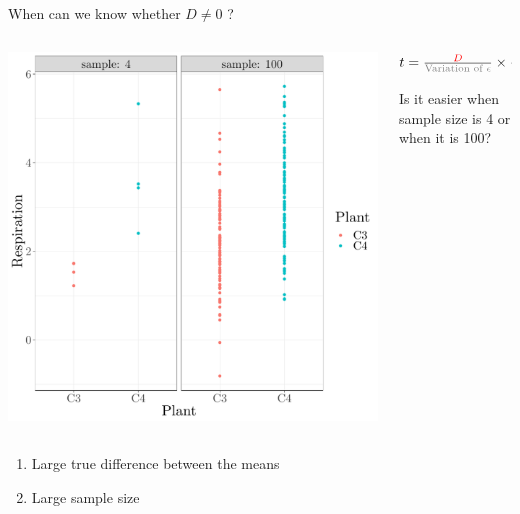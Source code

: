 \documentclass[10pt]{beamer}
\begin{document}
\begin{frame}{When can we know whether $D \neq 0$ ?}

 \begin{columns}
 \begin{column}{0.5\textwidth}
 \includegraphics[width=\textwidth]{Figures/figure/ttestsample-1}
 \end{column}
 \begin{column}{0.5\textwidth}
  $ t = \frac{\color{red}{D}}{\text{\color{gray}{Variation of }}\color{gray}{\epsilon}} \times \frac{\text{Sample Size}}{\sqrt{2}}$

  \vspace{1cm}
  Is it easier when sample size is 4 or when it is 100?
 \end{column}
 \end{columns}
 
 \pause
 \begin{alertblock}{}
  \begin{enumerate}
   \item Large true difference between the means
   \item Large sample size
  \end{enumerate}
 \end{alertblock}

\end{frame}
\end{document}
